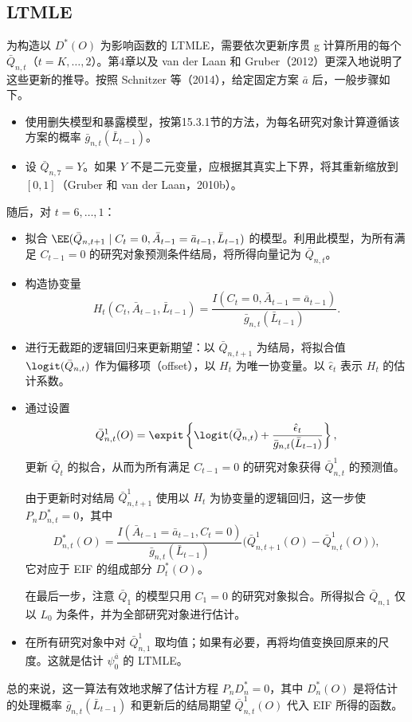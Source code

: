 \subsection{LTMLE}

为构造以 $D^*(O)$ 为影响函数的 LTMLE，需要依次更新序贯 g 计算所用的每个 $\bar Q_{n,t}$（$t=K,\ldots,2$）。第4章以及 van der Laan 和 Gruber（2012）更深入地说明了这些更新的推导。按照 Schnitzer 等（2014），给定固定方案 $\bar a$ 后，一般步骤如下。
\begin{itemize}
\item 使用删失模型和暴露模型，按第15.3.1节的方法，为每名研究对象计算遵循该方案的概率 $\bar g_{n,t}(\bar L_{t-1})$。
\item 设 $\bar Q_{n,7}=Y$。如果 $Y$ 不是二元变量，应根据其真实上下界，将其重新缩放到 $[0,1]$（Gruber 和 van der Laan，2010b）。
\end{itemize}
随后，对 $t=6,\ldots,1$：
\begin{itemize}[label=--]
\item 拟合 $\EE(\bar Q_{n,t+1}\mid C_t=0,\bar A_{t-1}=\bar a_{t-1},\bar L_{t-1})$ 的模型。利用此模型，为所有满足 $C_{t-1}=0$ 的研究对象预测条件结局，将所得向量记为 $\bar Q_{n,t}$。
\item 构造协变量
\[
 H_t(C_t,\bar A_{t-1},\bar L_{t-1})=
 \frac{I(C_t=0,\bar A_{t-1}=\bar a_{t-1})}{\bar g_{n,t}(\bar L_{t-1})}.
\]
\item 进行无截距的逻辑回归来更新期望：以 $\bar Q_{n,t+1}$ 为结局，将拟合值 $\logit(\bar Q_{n,t})$ 作为偏移项（offset），以 $H_t$ 为唯一协变量。以 $\hat\epsilon_t$ 表示 $H_t$ 的估计系数。
\item 通过设置
\[
 \bar Q_{n,t}^{1}(O)=\expit\left\{\logit(\bar Q_{n,t})+
 \frac{\hat\epsilon_t}{\bar g_{n,t}(\bar L_{t-1})}\right\},
\]
更新 $\bar Q_t$ 的拟合，从而为所有满足 $C_{t-1}=0$ 的研究对象获得 $\bar Q_{n,t}^{1}$ 的预测值。

由于更新时对结局 $\bar Q_{n,t+1}^{1}$ 使用以 $H_t$ 为协变量的逻辑回归，这一步使 $P_nD_{n,t}^*=0$，其中
\[
 D_{n,t}^*(O)=\frac{I(\bar A_{t-1}=\bar a_{t-1},C_t=0)}{\bar g_{n,t}(\bar L_{t-1})}
 \bigl(\bar Q_{n,t+1}^{1}(O)-\bar Q_{n,t}^{1}(O)\bigr),
\]
它对应于 EIF 的组成部分 $D_t^*(O)$。

在最后一步，注意 $\bar Q_1$ 的模型只用 $C_1=0$ 的研究对象拟合。所得拟合 $\bar Q_{n,1}$ 仅以 $L_0$ 为条件，并为全部研究对象进行估计。
\end{itemize}
\begin{itemize}
\item 在所有研究对象中对 $\bar Q_{n,1}^{1}$ 取均值；如果有必要，再将均值变换回原来的尺度。这就是估计 $\psi_0^{\bar a}$ 的 LTMLE。
\end{itemize}
总的来说，这一算法有效地求解了估计方程 $P_nD_n^*=0$，其中 $D_n^*(O)$ 是将估计的处理概率 $\bar g_{n,t}(\bar L_{t-1})$ 和更新后的结局期望 $\bar Q_{n,t}^{1}(O)$ 代入 EIF 所得的函数。

